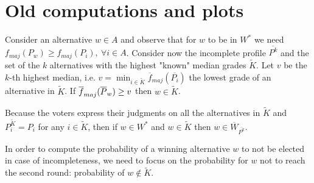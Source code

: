 \documentclass[version=3.21, pagesize, twoside=off, bibliography=totoc, DIV=calc, fontsize=12pt, a4paper]{scrartcl}
\begin{document}
\section{Old computations and plots}
Consider an alternative $w\in A$ and observe that for $w$ to be in $W^*$ we need $f_{maj}(P_w)\geq f_{maj}(P_i), \ \forall i \in A$. 
Consider now the incomplete profile $\overline{P^k}$ and the set of the $k$ alternatives with the highest "known" median grades $\tilde{K}$. 
Let $v$ be the $k$-th highest median, i.e. $v=\min_{i\in \tilde{K}} \overline{f}_{maj}(\overline{P_i})$ the lowest grade of an alternative in $\tilde{K}$. If $\overline{f}_{maj}(\overline{P}_w) \geq v$ then $w \in \tilde{K}$. 

Because the voters express their judgments on all the alternatives in $\tilde{K}$ 
and $P^{\tilde{K}}_{i} = P_i$ for any $i \in \tilde{K}$, then if $w \in W^*$ and $w \in \tilde{K}$ then $w \in \overline{W}_{\overline{P^k}}$.

In order to compute the probability of a winning alternative $w$ to not be elected in case of incompleteness, we need to focus on the probability for $w$ not to reach the second round: probability of $w \notin \tilde{K}$.
\end{document}
